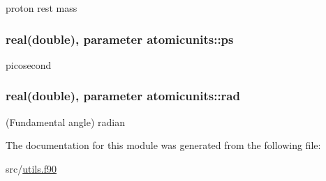 proton rest mass 

\hypertarget{classatomicunits_af5dac3bb123ac05a538d6ebd2373eb3b}{
\subsubsection[{ps}]{\setlength{\rightskip}{0pt plus 5cm}real(double), parameter atomicunits\-::ps}}\label{classatomicunits_af5dac3bb123ac05a538d6ebd2373eb3b}


picosecond 

\hypertarget{classatomicunits_a07ac069b1a5417fd61aa3954d6b66d83}{
\subsubsection[{rad}]{\setlength{\rightskip}{0pt plus 5cm}real(double), parameter atomicunits\-::rad}}\label{classatomicunits_a07ac069b1a5417fd61aa3954d6b66d83}


(Fundamental angle) radian 



The documentation for this module was generated from the following file\-:\begin{DoxyCompactItemize}
\item 
src/\hyperlink{utils_8f90}{utils.\-f90}\end{DoxyCompactItemize}

